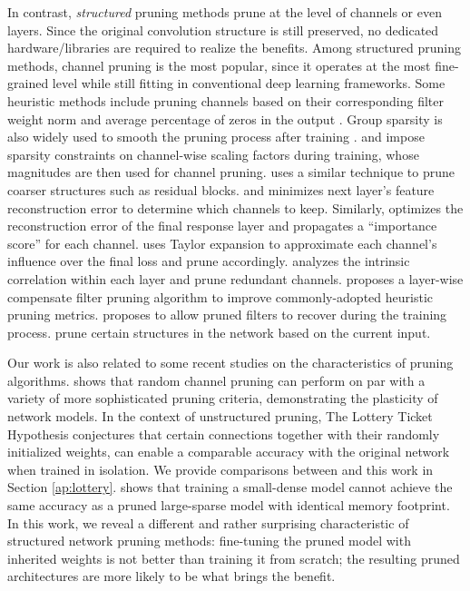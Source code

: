 In contrast, \emph{structured} pruning methods prune at the level of channels or even layers. Since the original convolution structure is still preserved, no dedicated hardware/libraries are required to realize the benefits. Among structured pruning methods, channel pruning is the most popular, since it operates at the most fine-grained level while still fitting in conventional deep learning frameworks. Some heuristic methods include pruning channels based on their corresponding filter weight norm \citep{li2016pruning} and average percentage of zeros in the output \citep{trimming}. Group sparsity is also widely used to smooth the pruning process after training \citep{wen2016learning, gs1, gs2, gs3}. \cite{liu2017learning} and \cite{ye2018rethinking} impose  sparsity constraints on channel-wise scaling factors during training, whose magnitudes are then used for channel pruning. \cite{huang2018data} uses a similar technique to prune coarser structures such as residual blocks. \cite{he2017channel} and \cite{luo2017thinet} minimizes next layer's feature reconstruction error to determine which channels to keep. Similarly, \cite{nisp} optimizes the reconstruction error of the final response layer and propagates a ``importance score'' for each channel. \cite{nvidia} uses Taylor expansion to approximate each channel's influence over the final loss and prune accordingly. \cite{pfa} analyzes the intrinsic correlation within each layer and prune redundant channels.  \cite{chin2018layer} proposes a layer-wise compensate filter pruning algorithm to improve commonly-adopted heuristic pruning metrics. \cite{he2018sfp} proposes to allow pruned filters to recover during the training process. \cite{lin2017runtime, wang2017skipnet} prune certain structures in the network based on the current input.

Our work is also related to some recent studies on the characteristics of pruning algorithms. \cite{recovering} shows that random channel pruning \citep{compact} can perform on par with a variety of more sophisticated pruning criteria, demonstrating the plasticity of network models. 
In the context of unstructured pruning, The Lottery Ticket Hypothesis \citep{lottery} conjectures that  certain connections together with their randomly initialized weights, can enable a comparable accuracy with the original network when trained in isolation. We provide comparisons between \cite{lottery} and this work in Section \ref{ap:lottery}.
\cite{toprune} shows that training a small-dense model cannot achieve the same accuracy as a pruned large-sparse model with identical memory footprint. In this work, we reveal a different and rather surprising characteristic of structured network pruning methods: fine-tuning the pruned model with inherited weights is not better than training it from scratch; the resulting pruned architectures are more likely to be what brings the benefit.
